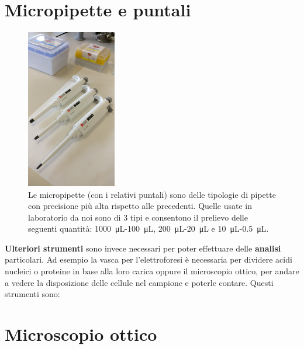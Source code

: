 \documentclass{report}
\begin{document}
	\vspace{0.5cm}


	\section{Micropipette e puntali}

	\begin{figure}[H]

		\includegraphics[width=0.35\textwidth]{./immagini/micropipette.jpg}
		\caption{Le micropipette (con i relativi puntali)
		sono delle tipologie di pipette con precisione più alta rispetto alle precedenti.
		Quelle usate in laboratorio da noi sono di 3 tipi e consentono il prelievo delle seguenti quantit\`a:
		\SI{1000}{\micro\liter}-\SI{100}{\micro\liter}, \SI{200}{\micro\liter}-\SI{20}{\micro\liter} e
		\SI{10}{\micro\liter}-\SI{0.5}{\micro\liter}. }
		\label{micropipette}

	\end{figure}

	\vspace{0.5cm}

	\textbf{Ulteriori strumenti} sono invece necessari per poter effettuare delle \textbf{analisi} particolari.
	Ad esempio la vasca per l'elettroforesi \`e necessaria per dividere acidi nucleici o proteine
	in base alla loro carica oppure il microscopio ottico, per andare a vedere la
	disposizione delle cellule nel campione e poterle contare.
	Questi strumenti sono:

	\section{Microscopio ottico}
\end{document}
